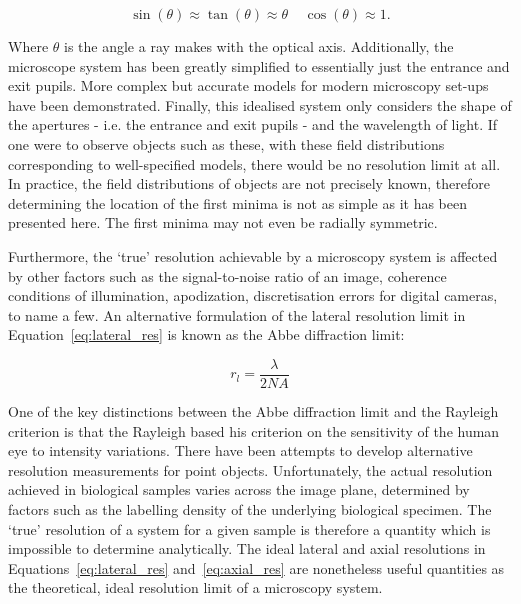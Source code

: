 \begin{equation}\label{eq:paraxial}
\sin(\theta) \approx \tan(\theta) \approx \theta~~~~~\cos(\theta) \approx 1.
\end{equation}

Where $\theta$ is the angle a ray makes with the optical axis. Additionally, the microscope system has been greatly simplified to essentially just the 
entrance and exit pupils. More complex but accurate models for modern 
microscopy set-ups have been 
demonstrated\cite{torok2007optical,foreman2011computational}. Finally, this 
idealised system only considers the shape of the apertures - i.e. the 
entrance and exit pupils - and the wavelength of light. If one were to 
observe objects such as these, with these field distributions corresponding 
to well-specified models, there would be no resolution limit at 
all\cite{den1997resolution}. In practice, the field distributions of objects 
are not precisely known, therefore determining the location of the first 
minima is not as simple as it has been presented here. The first minima may 
not even be radially symmetric. 

Furthermore, the `true' resolution achievable by a microscopy system is 
affected by other factors such as the signal-to-noise ratio of an
image, coherence conditions of illumination, apodization, discretisation 
errors for digital cameras, to name a few\cite{den1997resolution}. An alternative formulation of the lateral resolution limit in Equation~\ref{eq:lateral_res} is known as the Abbe diffraction limit\cite{abbe1873beitrage}:

\begin{equation}\label{eq:lateral_res_abbe}
r_{l} = \frac{\lambda}{2NA}
\end{equation}

One of the key distinctions between the Abbe diffraction limit and the 
Rayleigh criterion is that the Rayleigh based his criterion on the 
sensitivity of the human eye to intensity 
variations\cite{weisenburger2015light}. There have been attempts to develop 
alternative resolution measurements for point objects\cite{ram2006beyond}. 
Unfortunately, the actual resolution achieved in biological samples varies 
across the image plane, determined by factors such as the labelling density 
of the underlying biological specimen\cite{culley2017nanoj}. The `true' 
resolution of a system for a given sample is therefore a quantity which is 
impossible to determine analytically. The ideal lateral and axial resolutions 
in Equations~\ref{eq:lateral_res} and~\ref{eq:axial_res} are nonetheless 
useful quantities as the theoretical, ideal resolution limit of a microscopy 
system.

